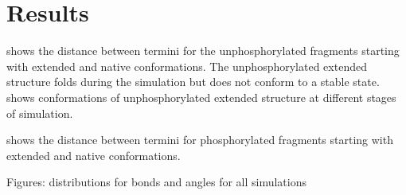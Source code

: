 \section{Results} %
\label{sec:results}



 shows the distance between termini for the unphosphorylated fragments starting with extended and native conformations.
The unphosphorylated extended structure folds during the simulation but does not conform to a stable state.
 shows conformations of unphosphorylated extended structure at different stages of simulation.

 shows the distance between termini for phosphorylated fragments starting with extended and native conformations.










Figures: distributions for bonds and angles for all simulations

